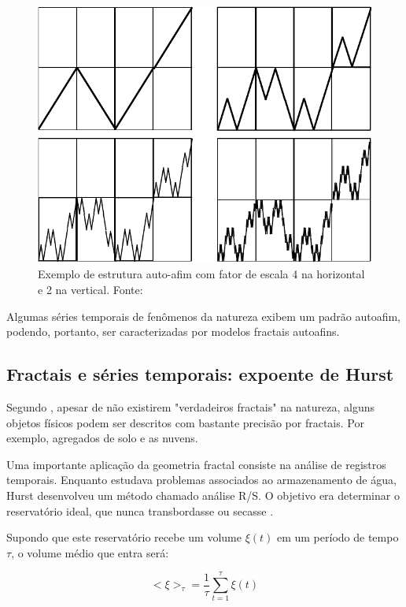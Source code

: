 \documentclass{ufscThesis}
\begin{document}
\begin{figure}[!h]
\centering
\includegraphics[scale=0.2]{autoafim.png}
\caption{Exemplo de estrutura auto-afim com fator de escala 4 na horizontal e 2 na vertical. Fonte: }
\label{autoafim}
\end{figure}

Algumas séries temporais de fenômenos da natureza exibem um padrão autoafim, podendo, portanto, ser caracterizadas por modelos fractais autoafins.\par

\subsection{Fractais e séries temporais: expoente de Hurst}

Segundo , apesar de não existirem "verdadeiros fractais" na natureza, alguns objetos físicos podem ser descritos com bastante precisão por fractais. Por exemplo, agregados de solo e as nuvens. \par
Uma importante aplicação da geometria fractal consiste na análise de registros temporais. Enquanto estudava problemas associados ao armazenamento de água, Hurst desenvolveu um método chamado análise R/S. O objetivo era determinar o reservatório ideal, que nunca transbordasse ou secasse \cite{feder1988fractals,Mandelbrot1968}. \par
Supondo que este reservatório recebe um volume $\xi(t)$ em um período de tempo $\tau$, o volume médio que entra será:

\begin{equation}
<\xi>_{\tau} = \frac{1}{\tau} \sum_{t=1}^{\tau} \xi(t)
\label{fluxomed}
\end{equation}
\end{document}
